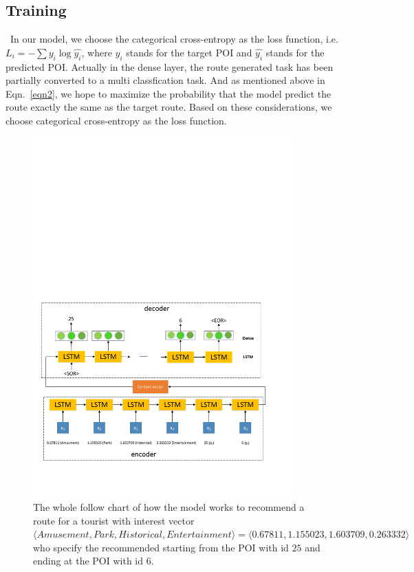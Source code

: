\documentclass[runningheads]{llncs}
\begin{document}
\subsection{Training}
\quad\, In our model, we choose the categorical cross-entropy as the loss function, i.e. $L_i=-\sum y_i\log\hat{y_i}$, where $y_i$ stands for the target POI and $\hat{y_i}$ stands for the predicted POI. Actually in the dense layer, the route generated task has been partially converted to a multi classfication task. And as mentioned above in Eqn.~\eqref{eqn2}, we hope to maximize the probability that the model predict the route exactly the same as the target route. Based on these considerations, we choose categorical cross-entropy as the loss function.  
\begin{figure}
	\centering
	\includegraphics[width=0.9\textwidth]{model.pdf}
	\caption{The whole follow chart of how the model works to recommend a route for a tourist with interest vector $\langle Amusement,Park,Historical,Entertainment\rangle=\langle 0.67811,1.155023,1.603709,0.263332\rangle$ who specify the recommended starting from the POI with id $25$ and ending at the POI with id $6$. }\label{fig2}
\end{figure}
\end{document}
